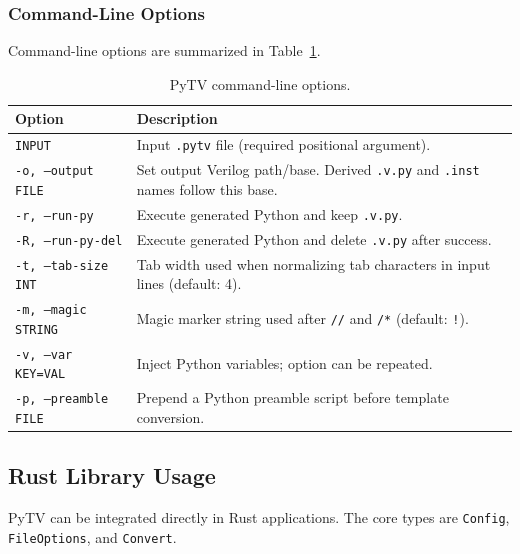 \subsubsection*{Command-Line Options}
Command-line options are summarized in Table~\ref{tab:cli-options}.
\begin{table}[htbp]
\centering
\small
\caption{PyTV command-line options.}
\label{tab:cli-options}
\begin{tabularx}{\linewidth}{@{} l X @{}}
\toprule
\textbf{Option} & \textbf{Description} \\
\midrule
\texttt{INPUT} & Input \texttt{.pytv} file (required positional argument). \\
\texttt{-o, --output FILE} & Set output Verilog path/base. Derived \texttt{.v.py} and \texttt{.inst} names follow this base. \\
\texttt{-r, --run-py} & Execute generated Python and keep \texttt{.v.py}. \\
\texttt{-R, --run-py-del} & Execute generated Python and delete \texttt{.v.py} after success. \\
\texttt{-t, --tab-size INT} & Tab width used when normalizing tab characters in input lines (default: 4). \\
\texttt{-m, --magic STRING} & Magic marker string used after \texttt{//} and \texttt{/*} (default: \texttt{!}). \\
\texttt{-v, --var KEY=VAL} & Inject Python variables; option can be repeated. \\
\texttt{-p, --preamble FILE} & Prepend a Python preamble script before template conversion. \\
\bottomrule
\end{tabularx}
\normalsize
\end{table}

\subsection{Rust Library Usage}
PyTV can be integrated directly in Rust applications.
The core types are \texttt{Config}, \texttt{FileOptions}, and \texttt{Convert}.

